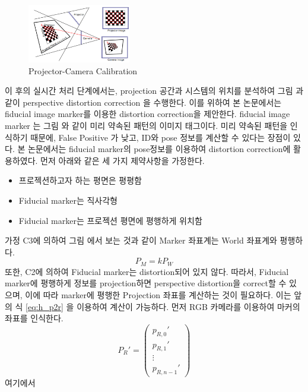 \begin{figure}[ht!]
    \centering
    \includegraphics[width=0.4\textwidth]{3-System/calibration1}
    \caption{Projector-Camera Calibration}
    \label{fig:procam_calibration}
\end{figure}

이 후의 실시간 처리 단계에서는, projection 공간과 시스템의 위치를 분석하여 그림 과 같이 perspective distortion correction 을 수행한다. 이를 위하여 본 논문에서는 fiducial image marker를 이용한 distortion correction을 제안한다. fiducial image marker 는 그림 와 같이 미리 약속된 패턴의 이미지 태그이다. 미리 약속된 패턴을 인식하기 때문에, False Positive 가 낮고, ID와 pose 정보를 계산할 수 있다는 장점이 있다. 본 논문에서는 fiducial marker의 pose정보를 이용하여 distortion correction에 활용하였다. 먼저 아래와 같은 세 가지 제약사항을 가정한다.
\begin{itemize}
    \item 프로젝션하고자 하는 평면은 평평함
    \item Fiducial marker는 직사각형
    \item Fiducial marker는 프로젝션 평면에 평행하게 위치함
\end{itemize}

가정 C3에 의하여 그림 에서 보는 것과 같이 Marker 좌표계는 World 좌표계와 평행하다. 
\begin{equation}
    P_M = kP_W
    \label{eq:marker2world}
\end{equation}
또한, C2에 의하여 Fiducial marker는 distortion되어 있지 않다. 따라서, Fiducial marker에 평행하게 정보를 projection하면 perspective distortion을 correct할 수 있으며, 이에 따라 marker에 평행한 Projection 좌표를 계산하는 것이 필요하다.
이는 앞의 식 \ref{eq:h_p2r} 을 이용하여 계산이 가능하다.
먼저 RGB 카메라를 이용하여 마커의 좌표를 인식한다.
\begin{equation}
    P_R' = \begin{pmatrix} 
        p_{R, 0}' \\
        p_{R, 1}' \\
        \vdots \\
        p_{R, n-1}'
    \end{pmatrix}
    \label{eq:marker2world}
\end{equation}
여기에서 







